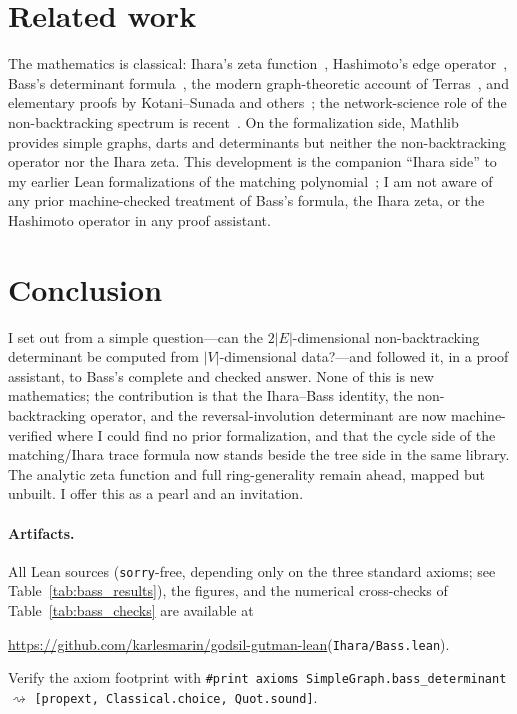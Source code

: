 \documentclass[11pt]{article}
\newcommand{\lean}[1]{\texttt{#1}}
\begin{document}
\section{Related work}
\label{sec:related}

The mathematics is classical: Ihara's zeta function~\cite{Ihara1966}, Hashimoto's edge
operator~\cite{Hashimoto1989}, Bass's determinant formula~\cite{Bass1992}, the modern
graph-theoretic account of Terras~\cite{Terras2011}, and elementary proofs by Kotani--Sunada and
others~\cite{KotaniSunada2000}; the network-science role of the non-backtracking spectrum is
recent~\cite{KarrerNewmanZdeborova2014}. On the formalization side, Mathlib~\cite{Mathlib2020}
provides simple graphs, darts and determinants but neither the non-backtracking operator nor the
Ihara zeta. This development is the companion ``Ihara side'' to my earlier Lean formalizations of
the matching polynomial~\cite{PartI,PartII}; I am not aware of any prior machine-checked
treatment of Bass's formula, the Ihara zeta, or the Hashimoto operator in any proof assistant.

\section{Conclusion}

I set out from a simple question---can the $2|E|$-dimensional non-backtracking determinant be
computed from $|V|$-dimensional data?---and followed it, in a proof assistant, to Bass's complete and
checked answer. None of this is new mathematics; the contribution is that the Ihara--Bass identity,
the non-backtracking operator, and the reversal-involution determinant are now machine-verified where
I could find no prior formalization, and that the cycle side of the matching/Ihara trace formula now
stands beside the tree side in the same library. The analytic zeta function and full ring-generality
remain ahead, mapped but unbuilt. I offer this as a pearl and an invitation.

\paragraph{Artifacts.} All Lean sources (\lean{sorry}-free, depending only on the three standard
axioms; see Table~\ref{tab:bass_results}), the figures, and the numerical cross-checks of
Table~\ref{tab:bass_checks} are available at
\begin{center}
\url{https://github.com/karlesmarin/godsil-gutman-lean}\quad(\lean{Ihara/Bass.lean}).
\end{center}
Verify the axiom footprint with \lean{\#print axioms SimpleGraph.bass\_determinant}
$\rightsquigarrow$ \lean{[propext, Classical.choice, Quot.sound]}.



\end{document}

